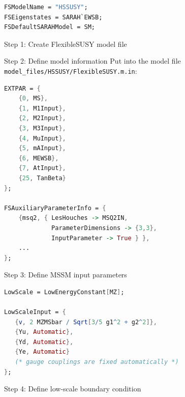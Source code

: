 \documentclass[hyperref={pdfpagelabels=false},ngerman]{beamer}
\begin{document}
\begin{lrbox}{\listboxt}\begin{lstlisting}[language=Mathematica]
FSModelName = "HSSUSY";
FSEigenstates = SARAH`EWSB;
FSDefaultSARAHModel = SM;
\end{lstlisting}\end{lrbox}

\begin{frame}{Step 1: Create FlexibleSUSY model file}
  \usebox{\listbox}
\end{frame}

\begin{frame}{Step 2: Define model information}
  Put into the model file
  \lstinline{model_files/HSSUSY/FlexibleSUSY.m.in}:
  \\[2em]
  \usebox{\listboxt}
\end{frame}

\begin{lrbox}{\listbox}\begin{lstlisting}[language=Mathematica]
EXTPAR = {
    {0, MS},
    {1, M1Input},
    {2, M2Input},
    {3, M3Input},
    {4, MuInput},
    {5, mAInput},
    {6, MEWSB},
    {7, AtInput},
    {25, TanBeta}
};

FSAuxiliaryParameterInfo = {
    {msq2, { LesHouches -> MSQ2IN,
             ParameterDimensions -> {3,3},
             InputParameter -> True } },
    ...
};
\end{lstlisting}\end{lrbox}

\begin{frame}{Step 3: Define MSSM input parameters}
  \usebox{\listbox}
\end{frame}

\begin{lrbox}{\listbox}\begin{lstlisting}[language=Mathematica]
LowScale = LowEnergyConstant[MZ];

LowScaleInput = {
   {v, 2 MZMSbar / Sqrt[3/5 g1^2 + g2^2]},
   {Yu, Automatic},
   {Yd, Automatic},
   {Ye, Automatic}
   (* gauge couplings are fixed automatically *)
};
\end{lstlisting}\end{lrbox}

\begin{frame}{Step 4: Define low-scale boundary condition}
  \begin{center}
  \end{center}
\end{frame}
\end{document}

